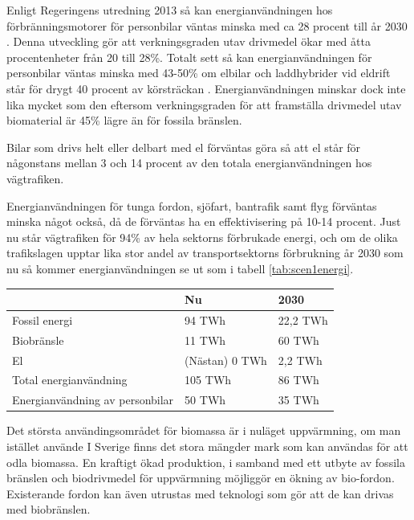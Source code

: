 \documentclass[a4paper,11pt,fleqn, titlepage]{article}
\begin{document}
Enligt Regeringens utredning 2013 så kan energianvändningen hos
förbränningsmotorer för personbilar väntas minska med ca 28 procent till år
2030 \cite{fossilfrihet}. Denna utveckling gör att verkningsgraden utav
drivmedel ökar med åtta procentenheter från 20 till 28\%.  Totalt sett så
kan energianvändningen för personbilar väntas minska med 43-50\% om elbilar
och laddhybrider vid eldrift står för drygt 40 procent av körsträckan
\cite{fossilfrihet}.  Energianvändningen minskar dock inte lika mycket som
den eftersom verkningsgraden för att framställa drivmedel utav biomaterial
är 45\% lägre än för fossila bränslen.

Bilar som drivs helt eller delbart med el förväntas göra så att el står för
någonstans mellan 3 och 14 procent av den totala energianvändningen hos
vägtrafiken.

Energianvändningen för tunga fordon, sjöfart, bantrafik samt flyg förväntas
minska något också, då de förväntas ha en effektivisering på 10-14 procent.
Just nu står vägtrafiken för 94\% av hela sektorns förbrukade energi, och
om de olika trafikslagen upptar lika stor andel av transportsektorns
förbrukning år 2030 som nu så kommer energianvändningen se ut som i tabell
\ref{tab:scen1energi}.

\begin{center}
	\label{tab:scen1energi}
	\begin{tabular}{ | l | l | l | }
	\hline
						& Nu		& 2030 \\ \hline
	Fossil energi				& 94 TWh	& 22,2 TWh \\ \hline
	Biobränsle				& 11 TWh	& 60 TWh \\ \hline %
	El					& (Nästan) 0 TWh &  2,2 TWh \\ \hline %
	Total energianvändning		& 105 TWh	& 86 TWh \\ \hline
	Energianvändning av personbilar	& 50 TWh	& 35 TWh \\ \hline
	\end{tabular}
\end{center}



Det största användingsområdet för biomassa är i nuläget uppvärmning, om man istället använde
I Sverige finns det stora mängder mark som kan användas för att odla biomassa. En kraftigt ökad produktion, i samband med ett utbyte av fossila bränslen och biodrivmedel för uppvärmning möjliggör en ökning av bio-fordon. Existerande fordon kan även utrustas med teknologi som gör att de kan drivas med biobränslen.
\end{document}
